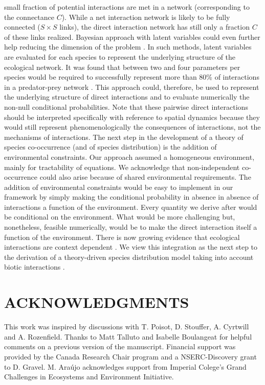 small fraction of potential interactions are met in a network (corresponding
to the connectance $C$). While a net interaction network is likely to be fully
connected ($S\times S$ links), the direct interaction network has still only a
fraction $C$ of these links realized. Bayesian approach with latent variables
could even further help reducing the dimension of the problem \citep[\textit{e.g.}][]{Rohr2010, Ovaskainen2010}. In such methods, latent variables
are evaluated for each species to represent the underlying structure of the
ecological network. It was found that between two and four parameters per
species would be required to successfully represent more than 80\% of interactions
in a predator-prey network \citep{Rohr2010}. This approach could,
therefore, be used to represent the underlying structure of direct interactions
and to evaluate numerically the non-null conditional probabilities. Note that these pairwise direct interactions should be interpreted
specifically with reference to spatial dynamics because they would still
represent phenomenologically the consequences of interactions, not the
mechanisms of interactions.
%
The next step in the development of a theory of species co-occurrence (and of
species distribution) is the addition of environmental constraints. Our
approach assumed a homogeneous environment, mainly for tractability of
equations. We acknowledge that non-independent co-occurrence could also arise
because of  shared environmental requirements. The addition of environmental
constraints would be easy to implement in our framework by simply making the
conditional probability in absence in absence of interactions a function of
the environment. Every quantity we derive after would be conditional on the
environment. What would be more challenging but, nonetheless, feasible
numerically, would be to make the direct interaction itself a function of the
environment. There is now growing evidence that ecological interactions are
context dependent \citep{Chamberlain2014, Poisot2012}. We
view this integration as the next step to the derivation of a theory-driven
species distribution model taking into account biotic interactions \citep{Thuiller2013}.

\section{ACKNOWLEDGMENTS}
This work was inspired by discussions with T. Poisot, D. Stouffer, A.
Cyrtwill and A. Rozenfield. Thanks to Matt Talluto and Isabelle Boulangeat for helpful comments on a previous version of the manuscript. Financial support was provided by the Canada Research Chair program
and a NSERC-Discovery grant to D. Gravel. M. Ara\'ujo acknowledges support from Imperial Colege’s Grand Challenges in Ecosystems and Environment Initiative.
